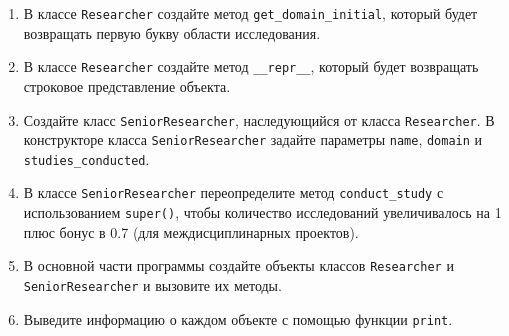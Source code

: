 \begin{enumerate}
\begin{enumerate}[leftmargin=*]
    \item В классе \texttt{Researcher} создайте метод \texttt{get\_domain\_initial}, который будет возвращать первую букву области исследования.
    
    \item В классе \texttt{Researcher} создайте метод \texttt{\_\_repr\_\_}, который будет возвращать строковое представление объекта.
    
    \item Создайте класс \texttt{SeniorResearcher}, наследующийся от класса \texttt{Researcher}. В конструкторе класса \texttt{SeniorResearcher} задайте параметры \texttt{name}, \texttt{domain} и \texttt{studies\_conducted}.
    
    \item В классе \texttt{SeniorResearcher} переопределите метод \texttt{conduct\_study} с использованием \texttt{super()}, чтобы количество исследований увеличивалось на 1 плюс бонус в 0.7 (для междисциплинарных проектов).
    
    \item В основной части программы создайте объекты классов \texttt{Researcher} и \texttt{SeniorResearcher} и вызовите их методы.
    
    \item Выведите информацию о каждом объекте с помощью функции \texttt{print}.
\end{enumerate}
\end{enumerate}